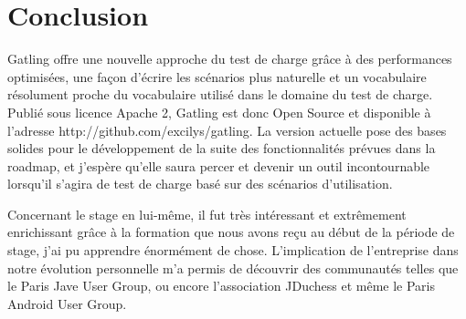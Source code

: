 \chapter{Conclusion}

Gatling offre une nouvelle approche du test de charge grâce à des performances optimisées, une façon d'écrire les scénarios plus naturelle et un vocabulaire résolument proche du vocabulaire utilisé dans le domaine du test de charge. Publié sous licence Apache 2, Gatling est donc Open Source et disponible à l'adresse http://github.com/excilys/gatling. La version actuelle pose des bases solides pour le développement de la suite des fonctionnalités prévues dans la roadmap, et j'espère qu'elle saura percer et devenir un outil incontournable lorsqu'il s'agira de test de charge basé sur des scénarios d'utilisation.

Concernant le stage en lui-même, il fut très intéressant et extrêmement enrichissant grâce à la formation que nous avons reçu au début de la période de stage, j'ai pu apprendre énormément de chose. L'implication de l'entreprise dans notre évolution personnelle m'a permis de découvrir des communautés telles que le Paris Jave User Group, ou encore l'association JDuchess et même le Paris Android User Group.
